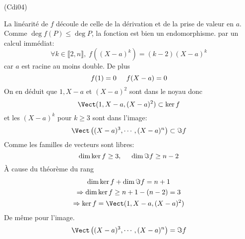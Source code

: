 \begin{tiny}(Cdi04)\end{tiny} La linéarité de $f$ découle de celle de la dérivation et de la prise de valeur en $a$. Comme $\deg f(P) \leq \deg P$, la fonction est bien un endomorphisme. par un calcul immédiat:
\begin{displaymath}
  \forall k\in \llbracket 2,n\rrbracket,\;
  f((X-a)^k) = (k-2)(X-a)^{k}
\end{displaymath}
car $a$ est racine au moins double. De plus
\begin{displaymath}
  f(1) = 0\hspace{0.5cm} f(X-a) = 0
\end{displaymath}
On en déduit que $1, X-a$ et $(X-a)^2$ sont dans le noyau donc
\begin{displaymath}
  \Vect(1,X-a, (X-a)^2)\subset \ker f
\end{displaymath}
et les $(X-a)^k$ pour $k\geq 3$ sont dans l'image:
\begin{displaymath}
\Vect\left( (X-a)^3,\cdots,(X-a)^n\right)
\subset \Im f
\end{displaymath}
Comme les familles de vecteurs sont libres:
\begin{displaymath}
\dim \ker f \geq 3, \hspace{0.5cm}
\dim \Im f \geq n-2
\end{displaymath}
\`A cause du théorème du rang
\begin{multline*}
\dim \ker f + \dim \Im f = n +1 \\
\Rightarrow \dim \ker f \geq n+1-(n-2) = 3 \\
\Rightarrow \ker f = \Vect(1,X-a, (X-a)^2)
\end{multline*}
De même pour l'image.
\begin{displaymath}
\Vect\left( (X-a)^3,\cdots,(X-a)^n\right) = \Im f  
\end{displaymath}
